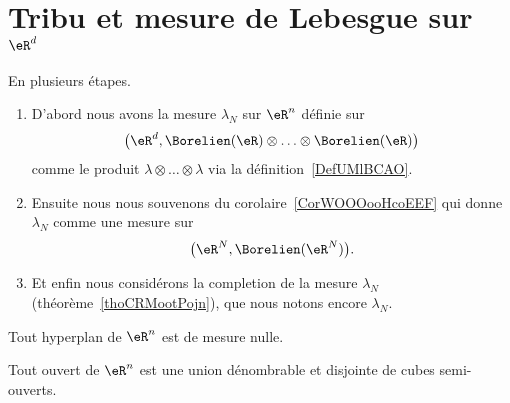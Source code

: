 \section{Tribu et mesure de Lebesgue sur \texorpdfstring{\(  \eR^d\)}{Rd}}

\begin{definition}      \label{DEFooSWJNooCSFeTF}
	En plusieurs étapes.
	\begin{enumerate}
		\item
		      D'abord nous avons la mesure \( \lambda_N\) sur \( \eR^n\) définie sur
		      \begin{equation}
			      \big( \eR^d,\Borelien(\eR)\otimes\ldots\otimes\Borelien(\eR) \big)
		      \end{equation}
		      comme le produit \( \lambda\otimes\ldots\otimes \lambda\) via la définition~\ref{DefUMlBCAO}.
		\item
		      Ensuite nous nous souvenons du corolaire~\ref{CorWOOOooHcoEEF} qui donne \( \lambda_N\) comme une mesure sur
		      \begin{equation}
			      \big( \eR^N,\Borelien(\eR^N) \big).
		      \end{equation}
		\item
		      Et enfin nous considérons la completion de la mesure \( \lambda_N\) (théorème~\ref{thoCRMootPojn}), que nous notons encore \( \lambda_N\).
	\end{enumerate}
\end{definition}

\begin{lemma}       \label{LEMooOLSMooCimcIT}
	Tout hyperplan de \( \eR^n\) est de mesure nulle.
\end{lemma}

\begin{proposition}     \label{PropSKXGooRFHQst}
	Tout ouvert de \( \eR^n\) est une union dénombrable et disjointe de cubes semi-ouverts.
\end{proposition}

